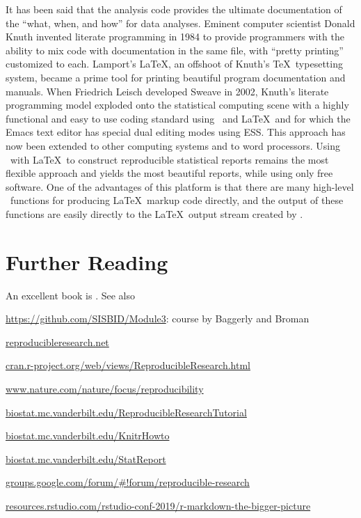 {\smaller[2]
It has been said that the analysis code provides the ultimate
documentation of the ``what, when, and how'' for data analyses.  Eminent
computer scientist Donald Knuth invented literate programming in 1984
to provide programmers with the ability to mix code with documentation
in the same file, with ``pretty printing'' customized to each.
Lamport's \LaTeX, an offshoot of Knuth's \TeX\ typesetting system, became
a prime tool for printing beautiful program documentation and manuals.
When Friedrich Leisch developed Sweave in 2002, Knuth's literate
programming model exploded onto the statistical computing scene with a
highly functional and easy to use coding standard using \R\ and \LaTeX\
and for which the Emacs text editor has special dual editing modes
using ESS.  This approach has now been extended to other computing
systems and to word processors.  Using \R\ with \LaTeX\ to construct
reproducible statistical reports remains the most flexible approach
and yields the most beautiful reports, while using only free software.
One of the advantages of this platform is that there are many
high-level \R\ functions for producing \LaTeX\ markup code directly, and
the output of these functions are easily directly to the \LaTeX\ output
stream created by \co{knitr}.}

\section{Further Reading}
An excellent book is \citet{irr}.  See also
\bi
\item \url{https://github.com/SISBID/Module3}: course by Baggerly and Broman
\item \url{reproducibleresearch.net}
\item \url{cran.r-project.org/web/views/ReproducibleResearch.html}
\item \url{www.nature.com/nature/focus/reproducibility}
\item \url{biostat.mc.vanderbilt.edu/ReproducibleResearchTutorial}
\item \url{biostat.mc.vanderbilt.edu/KnitrHowto}
\item \url{biostat.mc.vanderbilt.edu/StatReport}
\item \url{groups.google.com/forum/#!forum/reproducible-research}
\item \url{resources.rstudio.com/rstudio-conf-2019/r-markdown-the-bigger-picture}
\ei

    
